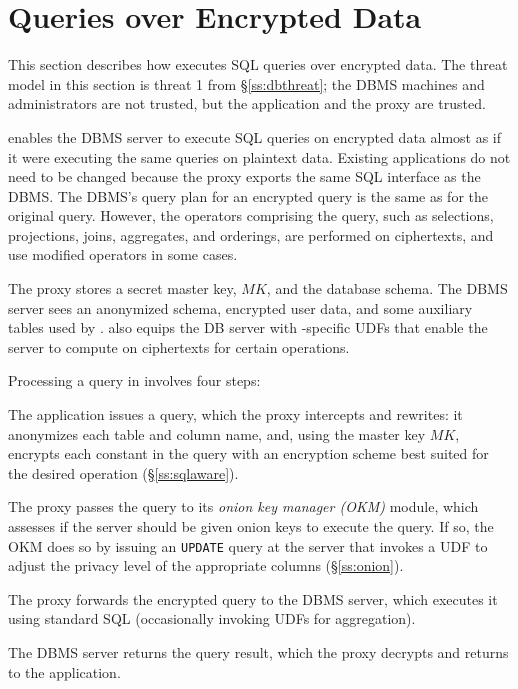 
\section{Queries over Encrypted Data}
\label{s:design}


This section describes how \name{} executes SQL queries over encrypted
data.  The threat model in this section is threat 1 from
\S\ref{ss:dbthreat}; the DBMS machines and administrators are not
trusted, but the application and the proxy are trusted.

\name{} enables the DBMS server to execute SQL queries on encrypted
data almost as if it were executing the same queries on plaintext
data. Existing applications do not need to be changed because the
proxy exports the same SQL interface as the DBMS\@. The DBMS's query
plan for an encrypted query is the same as for the original query.
However, the operators comprising the query, such as selections,
projections, joins, aggregates, and orderings, are performed on
ciphertexts, and use modified operators in some cases.

The \name{} proxy stores a secret master key, $\mathit{MK}$, and the database
schema.  The DBMS server sees an anonymized schema, encrypted user
data, and some auxiliary tables used by \name{}.  \name{} also equips
the DB server with \name{}-specific UDFs that enable the server to
compute on ciphertexts for certain operations.

Processing a query in \name{} involves four steps:
\begin{CompactEnumerate}
\item The application issues a query, which the proxy intercepts and
  rewrites: it anonymizes each table and column name, and, using the
  master key $\mathit{MK}$, encrypts each constant in the query with an
  encryption scheme best suited for the desired operation
  (\S\ref{ss:sqlaware}).
\item The proxy passes the query to its {\em onion key manager (OKM)}
  module, which assesses if the server should be given onion keys to
  execute the query. If so, the OKM does so by issuing an
  \texttt{UPDATE} query at the server that invokes a UDF to adjust the
  privacy level of the appropriate columns (\S\ref{ss:onion}).
\item The proxy forwards the encrypted query to the DBMS server,
  which executes it using standard SQL (occasionally invoking 
  UDFs for aggregation).
\item The DBMS server returns the query result, which the proxy
  decrypts and returns to the application.
\end{CompactEnumerate}

